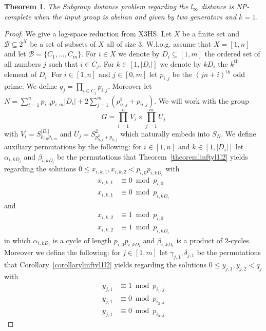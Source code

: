 \documentclass{article}
\newtheorem{theorem}{Theorem}
\begin{document}
\begin{theorem}\label{npcompletelinfty}
The {\sc Subgroup distance problem} regarding the $l_\infty$ distance is {\sf NP}-complete when the input group is abelian and given by two generators and $k=1$.
\end{theorem}
\begin{proof}
We give a log-space reduction from \textsf{X3HS}. Let $X$ be a finite set and $\mathcal{B} \subseteq 2^X$ be a set of subsets of $X$ all of size $3$. W.l.o.g. assume that $X = [1,n]$ and let $\mathcal{B} = \{C_1,\dots,C_m\}$. For $i \in X$ we denote by $D_i \subseteq [1,m]$ the ordered set of all numbers $j$ such that $i \in C_j$. For $k \in [1,|D_i|]$ we denote by $kD_i$ the $k^\text{th}$ element of $D_i$. For $i \in [1,n]$ and $j \in [0,m]$ let $p_{i,j}$ be the $(jn+i)^\text{th}$ odd prime. We define $q_j = \prod_{i \in C_j} p_{i,j}$. Moreover let $N = \sum_{i=1}^n p_{i,0}p_{i,m}|D_i| + 2\sum_{j=1}^m (p_{n,j}^2 + p_{n,j})$. We will work with the group
\begin{displaymath}
G = \prod_{i=1}^n V_i \times \prod_{j=1}^m U_j
\end{displaymath}
with $V_i = S_{p_{i,0}p_{i,m}}^{|D_i|}$ and $U_j = S_{p_{n,j}^2+p_{n,j}}^2$ which naturally embeds into $S_N$. We define auxiliary permutations by the following: for $i \in [1,n]$ and $k \in [1,|D_i|]$ let $\alpha_{i,kD_i}$ and $\beta_{i,kD_i}$ be the permutations that Theorem~\ref{theoremlinftyl1l2} yields regarding the solutions $0 \leq x_{i,k,1},x_{i,k,2} < p_{i,0}p_{i,kD_i}$ with
\begin{align*}
x_{i,k,1}&\equiv 0 \bmod p_{i,0}\\
x_{i,k,1}&\equiv 0 \bmod p_{i,kD_i}
\end{align*}
and
\begin{align*}
x_{i,k,2}&\equiv 1 \bmod p_{i,0}\\
x_{i,k,2}&\equiv 1 \bmod p_{i,kD_i}
\end{align*}
in which $\alpha_{i,kD_i}$ is a cycle of length $p_{i,0}p_{i,kD_i}$ and $\beta_{i,kD_i}$ is a product of $2$-cycles. Moreover we define the following: for $j \in [1,m]$ let $\gamma_{j,1},\delta_{j,1}$ be the permutations that Corollary~\ref{corollarylinftyl1l2} yields regarding the solutions $0 \leq y_{j,1},y_{j,2} < q_j$ with
\begin{align*}
y_{j,1}&\equiv 1 \bmod p_{i_1,j}\\
y_{j,1}&\equiv 0 \bmod p_{i_2,j}\\
y_{j,1}&\equiv 0 \bmod p_{i_3,j}
\end{align*}

\end{proof}
\end{document}
